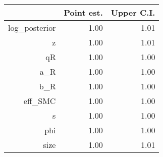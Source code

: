 \begin{table}[ht]
\centering
\begin{tabular}{rrr}
  \hline
 & Point est. & Upper C.I. \\ 
  \hline
log\_posterior & 1.00 & 1.01 \\ 
  z & 1.00 & 1.01 \\ 
  qR & 1.00 & 1.00 \\ 
  a\_R & 1.00 & 1.00 \\ 
  b\_R & 1.00 & 1.00 \\ 
  eff\_SMC & 1.00 & 1.00 \\ 
  s & 1.00 & 1.00 \\ 
  phi & 1.00 & 1.00 \\ 
  size & 1.00 & 1.01 \\ 
   \hline
\end{tabular}
\end{table}
